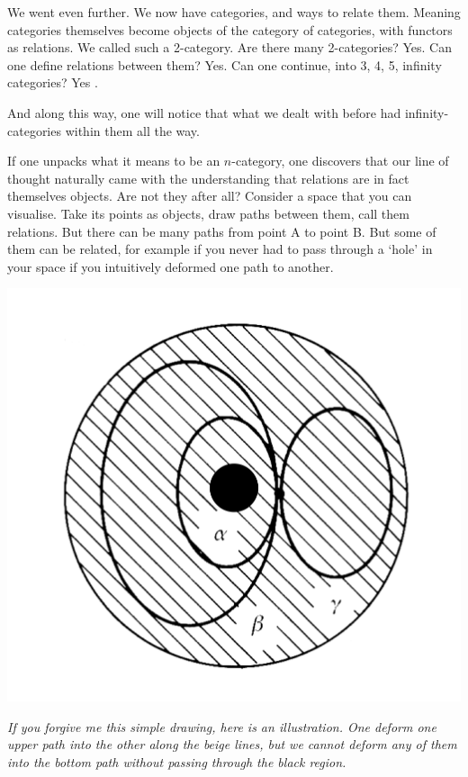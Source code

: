 \documentclass{article}
\begin{document}
We went even further. We now have categories, and ways to relate them. Meaning categories themselves become objects of the category of categories, with functors as relations. We called such a 2-category. Are there many 2-categories? Yes. Can one define relations between them? Yes. Can one continue, into 3, 4, 5, infinity categories? Yes \cite{BAEZ, NLABINFTY}.

And along this way, one will notice that what we dealt with before had infinity-categories within them all the way.

If one unpacks what it means to be an $n$-category, one discovers that our line of thought naturally came with the understanding that relations are in fact themselves objects. Are not they after all? Consider a space that you can visualise. Take its points as objects, draw paths between them, call them relations. But there can be many paths from point A to point B. But some of them can be related, for example if you never had to pass through a ‘hole’ in your space if you intuitively deformed one path to another.

\begin{center}
\includegraphics[scale=0.1]{paths}

\textit{If you forgive me this simple drawing, here is an illustration. One deform one upper path into the other along the beige lines, but we cannot deform any of them into the bottom path without passing through the black region.}
\end{center}
\end{document}

